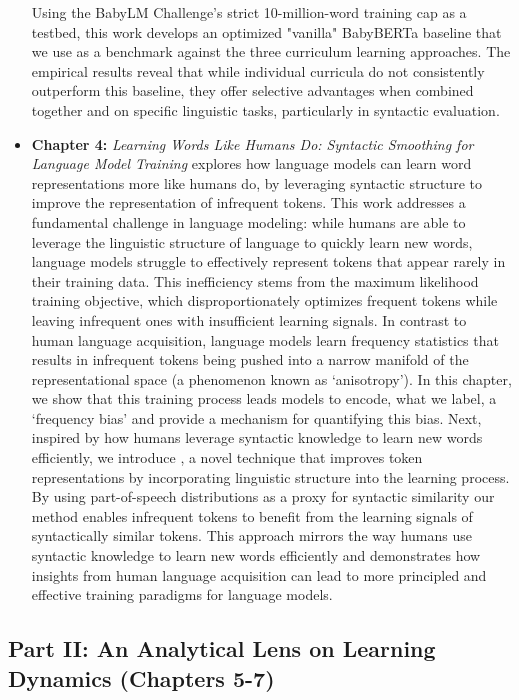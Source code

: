 \begin{itemize}
    Using the BabyLM Challenge's strict 10-million-word training cap as a testbed, this work develops an optimized "vanilla" BabyBERTa baseline that we use as a benchmark against the three curriculum learning approaches. The empirical results reveal that while individual curricula do not consistently outperform this baseline, they offer selective advantages when combined together and on specific linguistic tasks, particularly in syntactic evaluation.

    \item \textbf{Chapter 4:} \emph{Learning Words Like Humans Do: Syntactic Smoothing for Language Model Training}  
    explores how language models can learn word representations more like humans do, by leveraging syntactic structure to improve the representation of infrequent tokens. This work addresses a fundamental challenge in language modeling: while humans are able to leverage the linguistic structure of language to quickly learn new words, language models struggle to effectively represent tokens that appear rarely in their training data. This inefficiency stems from the maximum likelihood training objective, which disproportionately optimizes frequent tokens while leaving infrequent ones with insufficient learning signals. In contrast to human language acquisition, language models learn frequency statistics that results in infrequent tokens being pushed into a narrow manifold of the representational space (a phenomenon known as `anisotropy'). 
    In this chapter, we show that this training process leads models to encode, what we label, a `frequency bias' and provide a mechanism for quantifying this bias. Next, inspired by how humans leverage syntactic knowledge to learn new words efficiently, we introduce \smoothing, a novel technique that improves token representations by incorporating linguistic structure into the learning process. By using part-of-speech distributions as a proxy for syntactic similarity our method enables infrequent tokens to benefit from the learning signals of syntactically similar tokens. This approach mirrors the way humans use syntactic knowledge to learn new words efficiently and demonstrates how insights from human language acquisition can lead to more principled and effective training paradigms for language models.

\end{itemize}

\subsection*{Part II: An Analytical Lens on Learning Dynamics (Chapters 5-7)}

